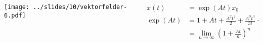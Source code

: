 \documentclass[aspectratio=169]{beamer}
\begin{document}
  \begin{frame}
    \titlepage
    \vspace{-1.5cm}
    \begin{columns}
    \begin{column}{.48\textwidth}
      \centering
      \texttt{[image: ../slides/10/vektorfelder-6.pdf]}
    \end{column}
    \begin{column}{.48\textwidth}
      \begin{align*}
        x(t) 
        &=
        \exp(At) x_0 
        \\
        \exp(At)
        &=
        1 + At + \frac{A^2t^2}{2} + \frac{A^3 t^3}{3!} + \ldots
        \\
        &=
       \lim_{n\to \infty} \left(1 + \frac{At}{n}\right)^n
      \end{align*}
    \end{column}
  \end{columns}
\end{frame}

\end{document}
